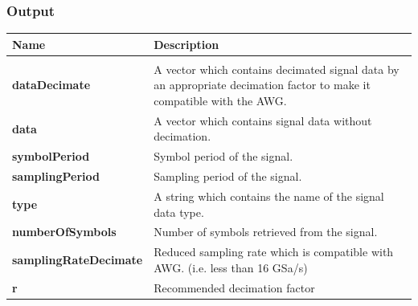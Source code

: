 \subsubsection*{Output}
\begin{tabular}{|p{4cm}||p{10cm}|}
	\hline
	\textbf{Name} &\textbf{Description}\\
	\hline
	\vspace{0.1cm}& \vspace{0.1cm}\\
	\textbf{dataDecimate} \vspace{0.25cm}& A vector which contains decimated signal data by an appropriate decimation factor to make it compatible with the AWG. \vspace{0.25cm}\\
	
	\textbf{data} \vspace{0.25cm}& A vector which contains signal data without decimation. \vspace{0.25cm}\\
	
	\textbf{symbolPeriod}\vspace{0.25cm}& Symbol period of the signal.\vspace{0.25cm}\\
	
	\textbf{samplingPeriod}\vspace{0.25cm}& Sampling period of the signal.\vspace{0.25cm}\\
	
	\textbf{type}\vspace{0.25cm}& A string which contains the name of the signal data type.\vspace{0.25cm}\\
	
	\textbf{numberOfSymbols}\vspace{0.25cm}& Number of symbols retrieved from the signal.\vspace{0.25cm}\\
	
	\textbf{samplingRateDecimate}\vspace{0.25cm}& Reduced sampling rate which is compatible with AWG. (i.e. less than 16 GSa/s)\vspace{0.25cm}\\
	
	\textbf{r}\vspace{0.25cm}&Recommended decimation factor\vspace{0.25cm}\\
	\hline
\end{tabular}
